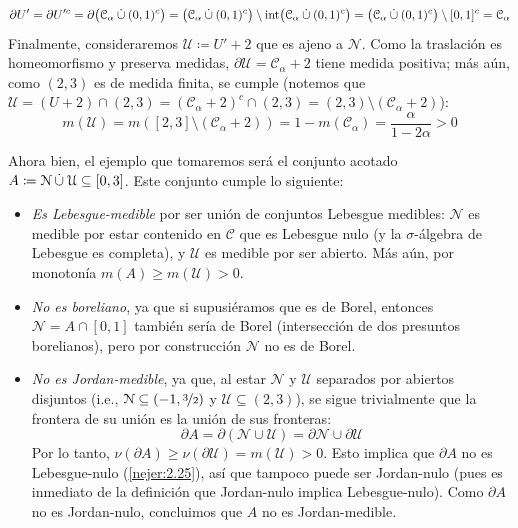 \begin{sol}
\[
\partial U' = \partial U'^c 
= \partial\bigl(\mathcal{C}_\alpha \mathbin{\dot{\cup}} (0,1)^c\bigr) 
= \bigl(\mathcal{C}_\alpha\mathbin{\dot{\cup}}(0,1)^c\bigr) \setminus \operatorname{int}\bigl(\mathcal{C}_\alpha\mathbin{\dot{\cup}}(0,1)^c\bigr)
= \bigl(\mathcal{C}_\alpha\mathbin{\dot{\cup}}(0,1)^c\bigr) \setminus [0,1]^c
= \mathcal{C}_\alpha
\]
Finalmente, consideraremos $\mathcal{U} \coloneq U' + 2$ que es ajeno a $\mathcal{N}$. Como la traslación es homeomorfismo y preserva medidas, $\partial\mathcal{U} = \mathcal{C}_\alpha + 2$ tiene medida positiva; más aún, como $(2,3)$ es de medida finita, se cumple (notemos que $\mathcal{U} = (U+2)\cap(2,3) = (\mathcal{C}_\alpha+2)^c\cap(2,3) = (2,3)\setminus(\mathcal{C}_\alpha+2)$):
\[
m(\mathcal{U}) = m([2,3]\setminus(\mathcal{C}_\alpha+2)) = 1 - m(\mathcal{C}_\alpha) = \frac{\alpha}{1-2\alpha} > 0
\]

Ahora bien, el ejemplo que tomaremos será el conjunto acotado $A \coloneq \mathcal{N} \mathbin{\dot{\cup}} \mathcal{U} \subseteq [0,3]$. Este conjunto cumple lo siguiente:
\begin{itemize}
    \item \emph{Es Lebesgue-medible} por ser unión de conjuntos Lebesgue medibles: $\mathcal{N}$ es medible por estar contenido en $\mathcal{C}$ que es Lebesgue nulo (y la $\sigma$-álgebra de Lebesgue es completa), y $\mathcal{U}$ es medible por ser abierto. Más aún, por monotonía $m(A) \ge m(\mathcal{U}) > 0$.

    \item \emph{No es boreliano}, ya que si supusiéramos que es de Borel, entonces $\mathcal{N} = A \cap [0,1]$ también sería de Borel (intersección de dos presuntos borelianos), pero por construcción $\mathcal{N}$ no es de Borel.

    \item \emph{No es Jordan-medible}, ya que, al estar $\mathcal{N}$ y $\mathcal{U}$ separados por abiertos disjuntos (i.e., $\mathcal{N} \subseteq (-1,\nicefrac32)$ y $\mathcal{U} \subseteq (2,3)$), se sigue trivialmente que la frontera de su unión es la unión de sus fronteras:
    \[
    \partial A = \partial(\mathcal{N} \cup \mathcal{U}) = \partial\mathcal{N} \cup \partial\mathcal{U}
    \]
    Por lo tanto, $\nu(\partial A) \ge \nu(\partial\mathcal{U}) = m(\mathcal{U}) > 0$. Esto implica que $\partial A$ no es Lebesgue-nulo (\cref{nejer:2.25}), así que tampoco puede ser Jordan-nulo (pues es inmediato de la definición que Jordan-nulo implica Lebesgue-nulo). Como $\partial A$ no es Jordan-nulo, concluimos que $A$ no es Jordan-medible.
\end{itemize}
\end{sol}